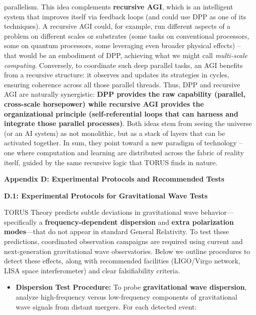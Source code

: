 \documentclass[
]{article}
\begin{document}
{\begin{itemize}
  parallelism\hspace{0pt}. This idea complements \textbf{recursive AGI},
  which is an intelligent system that improves itself via feedback loops
  (and could use DPP as one of its techniques). A recursive AGI could,
  for example, run different aspects of a problem on different scales or
  substrates (some tasks on conventional processors, some on quantum
  processors, some leveraging even broader physical effects) -- that
  would be an embodiment of DPP, achieving what we might call
  \emph{multi-scale computing}. Conversely, to coordinate such deep
  parallel tasks, an AGI benefits from a recursive structure: it
  observes and updates its strategies in cycles, ensuring coherence
  across all those parallel threads. Thus, DPP and recursive AGI are
  naturally synergistic: \textbf{DPP provides the raw capability
  (parallel, cross-scale horsepower) while recursive AGI provides the
  organizational principle (self-referential loops that can harness and
  integrate those parallel processes)}. Both ideas stem from seeing the
  universe (or an AI system) as not monolithic, but as a stack of layers
  that can be activated together. In sum, they point toward a new
  paradigm of technology -- one where computation and learning are
  distributed across the fabric of reality itself, guided by the same
  recursive logic that TORUS finds in nature.
\end{itemize}

\textbf{Appendix D: Experimental Protocols and Recommended Tests}

\textbf{D.1: Experimental Protocols for Gravitational Wave Tests}

TORUS Theory predicts subtle deviations in gravitational wave
behavior---specifically a \textbf{frequency-dependent dispersion} and
\textbf{extra polarization modes}---that do not appear in standard
General Relativity. To test these predictions, coordinated observation
campaigns are required using current and next-generation gravitational
wave observatories. Below we outline procedures to detect these effects,
along with recommended facilities (LIGO/Virgo network, LISA space
interferometer) and clear falsifiability criteria.

\begin{itemize}
\item
  \textbf{Dispersion Test Procedure:} To probe \textbf{gravitational
  wave dispersion}, analyze high-frequency versus low-frequency
  components of gravitational wave signals from distant mergers. For
  each detected event:


\end{itemize}}
\end{document}
